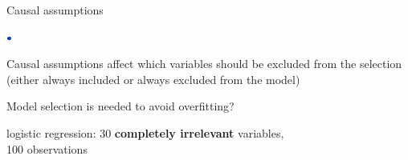 \documentclass[english,t]{beamer}
\newenvironment{list1}{
   \begin{list}{$\color{list1}\bullet$}{\itemsep=6pt}}{
  \end{list}}
\begin{document}
\begin{frame}{Causal assumptions}

  \begin{list1}
  \item Causal assumptions affect which variables should be excluded
    from the selection (either always included or always excluded from
    the model)
  \end{list1}

  
\end{frame}


  

\begin{frame}{Model selection is needed to avoid overfitting?}

  logistic regression: 30 \textbf{completely irrelevant} variables, \\100
  observations
  

\end{frame}
\end{document}
